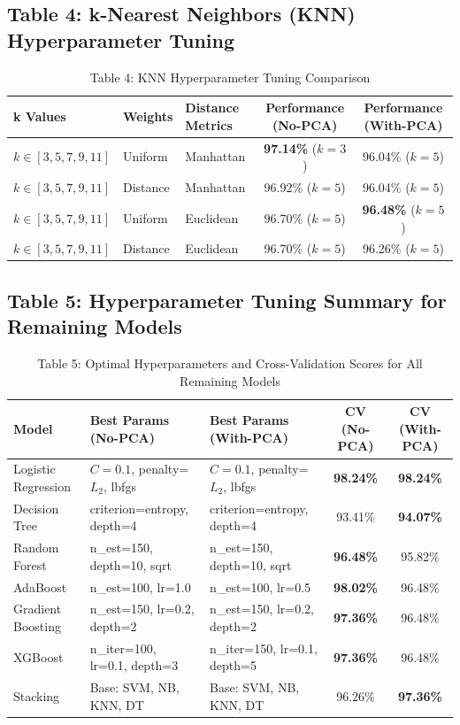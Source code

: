 \documentclass[12pt,a4paper]{article}
\begin{document}
\subsection*{Table 4: k-Nearest Neighbors (KNN) Hyperparameter Tuning}
\begin{table}[H]
\centering
\begin{tabular}{|l|l|l|c|c|}
\hline
\textbf{k Values} & \textbf{Weights} & \textbf{Distance Metrics} & \textbf{Performance (No-PCA)} & \textbf{Performance (With-PCA)} \\ \hline
$k \in [3, 5, 7, 9, 11]$ & Uniform & Manhattan & \textbf{97.14\%} ($k=3$) & 96.04\% ($k=5$) \\ \hline
$k \in [3, 5, 7, 9, 11]$ & Distance & Manhattan & 96.92\% ($k=5$) & 96.04\% ($k=5$) \\ \hline
$k \in [3, 5, 7, 9, 11]$ & Uniform & Euclidean & 96.70\% ($k=5$) & \textbf{96.48\%} ($k=5$) \\ \hline
$k \in [3, 5, 7, 9, 11]$ & Distance & Euclidean & 96.70\% ($k=5$) & 96.26\% ($k=5$) \\ \hline
\end{tabular}
\caption{Table 4: KNN Hyperparameter Tuning Comparison}
\label{tab:exp7_knn_tuning}
\end{table}

\subsection*{Table 5: Hyperparameter Tuning Summary for Remaining Models}
\begin{table}[H]
\centering
\small
\begin{tabular}{|p{3.2cm}|p{3.8cm}|p{3.8cm}|c|c|}
\hline
\textbf{Model} & \textbf{Best Params (No-PCA)} & \textbf{Best Params (With-PCA)} & \textbf{CV (No-PCA)} & \textbf{CV (With-PCA)} \\ \hline
Logistic Regression & $C=0.1$, penalty=$L_2$, lbfgs & $C=0.1$, penalty=$L_2$, lbfgs & \textbf{98.24\%} & \textbf{98.24\%} \\ \hline
Decision Tree & criterion=entropy, depth=4 & criterion=entropy, depth=4 & 93.41\% & \textbf{94.07\%} \\ \hline
Random Forest & n\_est=150, depth=10, sqrt & n\_est=150, depth=10, sqrt & \textbf{96.48\%} & 95.82\% \\ \hline
AdaBoost & n\_est=100, lr=1.0 & n\_est=100, lr=0.5 & \textbf{98.02\%} & 96.48\% \\ \hline
Gradient Boosting & n\_est=150, lr=0.2, depth=2 & n\_est=150, lr=0.2, depth=2 & \textbf{97.36\%} & 96.48\% \\ \hline
XGBoost & n\_iter=100, lr=0.1, depth=3 & n\_iter=150, lr=0.1, depth=5 & \textbf{97.36\%} & 96.48\% \\ \hline
Stacking & Base: SVM, NB, KNN, DT & Base: SVM, NB, KNN, DT & 96.26\% & \textbf{97.36\%} \\ \hline
\end{tabular}
\caption{Table 5: Optimal Hyperparameters and Cross-Validation Scores for All Remaining Models}
\label{tab:exp7_other_tuning}
\end{table}
\end{document}
